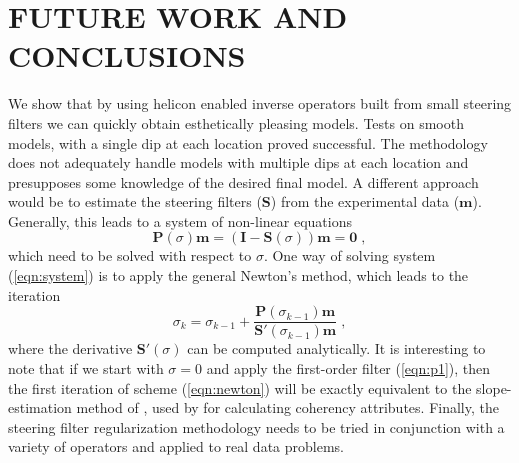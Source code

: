 \section{FUTURE WORK AND CONCLUSIONS}
We show that by using helicon enabled inverse 
operators built from small steering filters we can quickly obtain esthetically
pleasing models.
Tests on smooth models, with a single dip at each location proved 
successful.  The methodology does not adequately handle models with
multiple dips at each location and presupposes some knowledge of the
desired final model. 
A different approach would be to estimate
the steering filters ($\mathbf S$) from the experimental data ($\mathbf m$). 
Generally, this leads to a
system of non-linear equations
\begin{equation}
  \label{eqn:system}
  \mathbf{P}(\sigma) \mathbf{m} =
  (\mathbf{I} - \mathbf{S}(\sigma)) \mathbf{m} = \mathbf{0}\;,
\end{equation}
which need to be solved with respect to $\sigma$. One way of solving
system (\ref{eqn:system}) is to apply the general Newton's method,
which leads to the iteration
\begin{equation}
  \label{eqn:newton}
  \sigma_{k} = \sigma_{k-1} + \frac{\mathbf{P}(\sigma_{k-1})
    \mathbf{m}}{\mathbf{S}'(\sigma_{k-1}) \mathbf{m}}\;,
\end{equation}
where the derivative $\mathbf{S}'(\sigma)$ can be computed analytically.
It is interesting to note that if we start with $\sigma =0$ and apply
the first-order filter (\ref{eqn:p1}), then the first iteration of
scheme (\ref{eqn:newton}) will be exactly equivalent to the
slope-estimation method of , used by
 for calculating coherency attributes.
Finally, the steering filter
regularization methodology needs to be tried in
conjunction with a variety of operators and 
applied to  real data problems.









